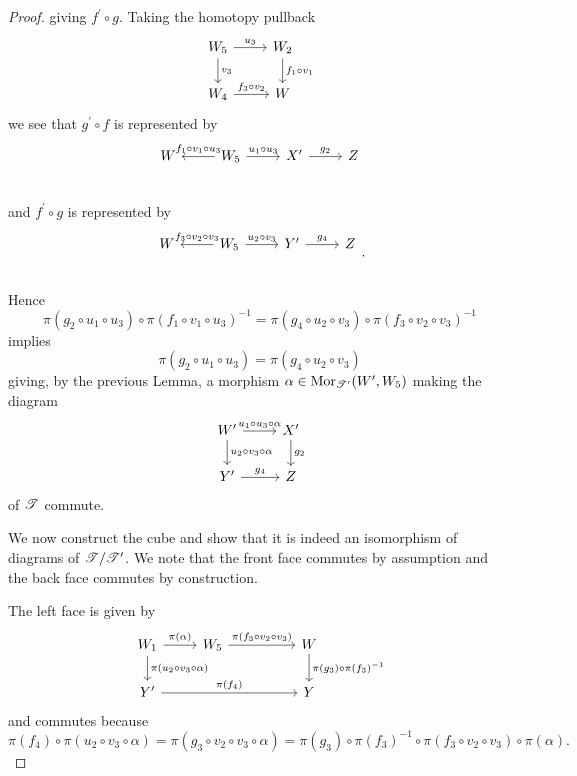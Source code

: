 \documentclass[dissertation.tex]{subfiles}
\begin{document}
\begin{lem}
\begin{proof}
    giving $f^\prime \circ g$.
    Taking the homotopy pullback
    $$\begin{tikzcd}
      W_5 \arrow{r}{u_3}\arrow{d}{v_3} & W_2\arrow{d}{f_1 \circ v_1}\\
      W_4 \arrow{r}{f_3 \circ v_2} & W
    \end{tikzcd}$$
    we see that $g^\prime \circ f$ is represented by
    $$\begin{tikzcd}
      W & W_5\arrow[swap]{l}{f_1 \circ v_1 \circ u_3}\arrow{r}{u_1 \circ u_3} & X^\prime \arrow{r}{g_2} & Z\\
    \end{tikzcd}$$
    and $f^\prime \circ g$ is represented by
    $$
    \begin{tikzcd}
      W & W_5 \arrow[swap]{l}{f_3 \circ v_2 \circ v_3}\arrow{r}{u_2 \circ v_3} & Y^\prime \arrow{r}{g_4} & Z\\
    \end{tikzcd}.$$
    Hence
    $$\pi(g_2 \circ u_1 \circ u_3)\circ\pi(f_1 \circ v_1 \circ u_3)^{-1} = \pi(g_4 \circ u_2 \circ v_3) \circ \pi(f_3 \circ v_2 \circ v_3)^{-1}$$
    implies
    $$\pi(g_2 \circ u_1 \circ u_3) =  \pi(g_4 \circ u_2 \circ v_3)$$
    giving, by the previous Lemma, a morphism $\alpha \in \operatorname{Mor}_{\mathscr{T}^\prime}(W^\prime, W_5)$ making the diagram
    $$\begin{tikzcd}
      W^\prime \arrow{r}{u_1 \circ u_3 \circ \alpha}\arrow{d}{u_2 \circ v_3 \circ \alpha} & X^\prime\arrow{d}{g_2}\\
      Y^\prime \arrow{r}{g_4} & Z
    \end{tikzcd}$$
    of $\mathscr{T}$ commute.
    
    We now construct the cube and show that it is indeed an isomorphism of diagrams of $\mathscr{T}/\mathscr{T}^\prime$.
    We note that the front face commutes by assumption and the back face commutes by construction.
    
    The left face is given by
    $$\begin{tikzcd}
      W_1 \arrow{r}{\pi(\alpha)}\arrow{d}{\pi(u_2 \circ v_3 \circ \alpha)} 
      & W_5 \arrow{rr}{\pi(f_3 \circ v_2 \circ v_3)} 
      & & W\arrow{d}{\pi(g_3)\circ\pi(f_3)^{-1}}\\
      Y^\prime \arrow{rrr}{\pi(f_4)} & & & Y
    \end{tikzcd}$$
    and commutes because
    $$\pi(f_4) \circ \pi(u_2 \circ v_3 \circ \alpha) = \pi(g_3 \circ v_2 \circ v_3 \circ \alpha) = \pi(g_3) \circ \pi(f_3)^{-1} \circ \pi(f_3 \circ v_2 \circ v_3) \circ \pi(\alpha).$$
    

\end{proof}
\end{lem}
\end{document}
